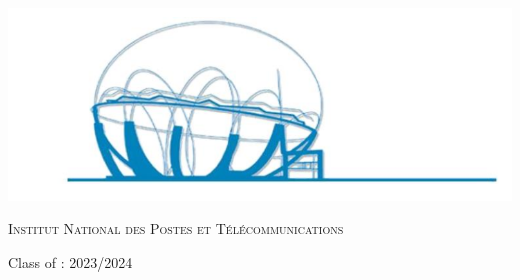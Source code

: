 \begin{center}
\begin{tabular}{p{1cm}lll}
\end{tabular}

\vspace{0.5cm}
\includegraphics[scale=0.6]{Logos/ZLAFA.png}


\textsc{Institut National des Postes et Télécommunications}

{\large Class of : 2023/2024}
   
\end{center}


